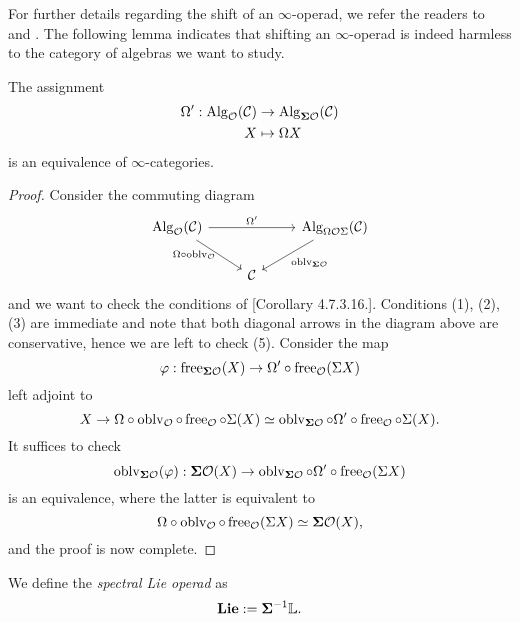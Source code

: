 For further details regarding the shift of an $\infty$-operad, we refer the readers to \cite[Section 2.2.4.]{Hadrianphdthesis} and \cite{Camarena_mod2_free_spectral_Lie_algebra}.
The following lemma indicates that shifting an $\infty$-operad is indeed harmless to the category of algebras we want to study.
\begin{lemma}
\label{Shift has no harm}
    The assignment 
    \begin{align*}
    \Omega': \operatorname{Alg}_{{\mathcal{O}} } ({\mathcal{C}}) &\to \operatorname{Alg}_{\mathbf{\Sigma} {\mathcal{O}} }({\mathcal{C}}) \\
    X &\mapsto  \Omega X
    \end{align*}
    is an equivalence of $\infty$-categories.
\end{lemma}
\begin{proof}
	Consider the commuting diagram
\[
\begin{tikzcd}
	\Alg_{\CO }(\CC)  &   & \Alg_{ \Omega \CO \Sigma}(\CC) \\
	& \CC &
	\arrow[from=1-1, to = 1-3, "\Omega'"]
	\arrow[from=1-1 , to =2-2, "\Omega\circ \oblv_{\CO}" left]
	\arrow[from=1-3, to=2-2, "\oblv_{\mathbf{\Sigma}\CO}"]
\end{tikzcd}
\]
and we want to check the conditions of \cite{HA}[Corollary 4.7.3.16.].
Conditions (1), (2), (3) are immediate and note that both diagonal arrows in the diagram above are conservative, hence we are left to check (5).
Consider the map
\[
\varphi: \operatorname{free}_{\mathbf{\Sigma}{\mathcal{O}}}(X) \to \Omega' 
\circ \operatorname{free}_{{\mathcal{O}}} (\Sigma X)
\]
left adjoint to
\[
X \to \Omega \circ \operatorname{oblv}_{{\mathcal{O}}}\circ
\operatorname{free}_{{\mathcal{O}}}
\circ
\Sigma(X)
\simeq 
\operatorname{oblv}_{\mathbf{\Sigma}{\mathcal{O}}}
\circ
\Omega'\circ \operatorname{free}_{{\mathcal{O}}}\circ \Sigma (X).
\]
It suffices to check 
\[
\operatorname{oblv}_{\mathbf{\Sigma}{\mathcal{O}}}(\varphi):
\mathbf{\Sigma}{\mathcal{O}}(X) \to 
\operatorname{oblv}_{\mathbf{\Sigma}{\mathcal{O}}} \circ \Omega'\circ \operatorname{free}_{{\mathcal{O}}} (\Sigma X)
\]
is an equivalence, where the latter is equivalent to 
$$
\Omega \circ \operatorname{oblv}_{{\mathcal{O}}}\circ \operatorname{free}_{{\mathcal{O}}}(\Sigma X)\simeq \mathbf{\Sigma}{\mathcal{O}}(X),
$$
and the proof is now complete.
\end{proof}

\begin{definition}
	\label{spectral Lie operad}
	We define the \emph{spectral Lie operad} as $$
	\mathbf{Lie} := \mathbf{\Sigma}^{-1} {\mathbb{L}}.
	$$
\end{definition}

